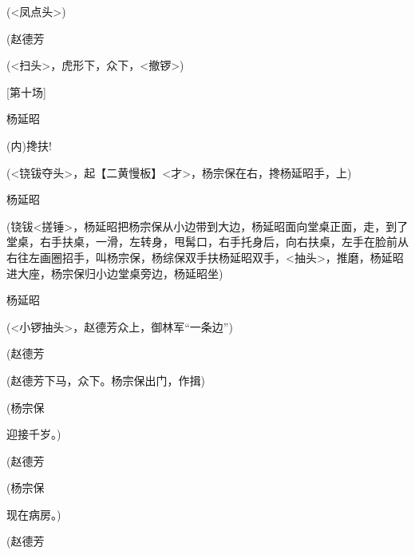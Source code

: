 ({\textless{}凤点头\textgreater{}})

(赵德芳\hspace{20pt}~


({\textless{}扫头\textgreater{}，虎形下，众下，\textless{}撤锣\textgreater{}})

{[}第十场{]}

杨延昭\hspace{20pt}~

({\akai 内})搀扶!

({\textless{}铙钹夺头\textgreater{}，起}【{\akai 二黄慢板}】{\textless{}才\textgreater{}，杨宗保在右，搀杨延昭手，上})

杨延昭


({铙钹\textless{}搓锤\textgreater{}，杨延昭把杨宗保从小边带到大边，杨延昭面向堂桌正面，走，到了堂桌，右手扶桌，一滑，左转身，甩髯口，右手托身后，向右扶桌，左手在脸前从右往左画圈招手，叫杨宗保，杨综保双手扶杨延昭双手，\textless{}抽头\textgreater{}，推磨，杨延昭进大座，杨宗保归小边堂桌旁边，杨延昭坐})

杨延昭\hspace{20pt}~


({\textless{}小锣抽头\textgreater{}，赵德芳众上，御林军``一条边''})

(赵德芳\hspace{20pt}~


(赵德芳下马，众下。杨宗保出门，作揖)

(杨宗保\hspace{20pt}~

迎接千岁。)

(赵德芳\hspace{20pt}~


(杨宗保\hspace{20pt}~

现在病房。)

(赵德芳\hspace{20pt}~

